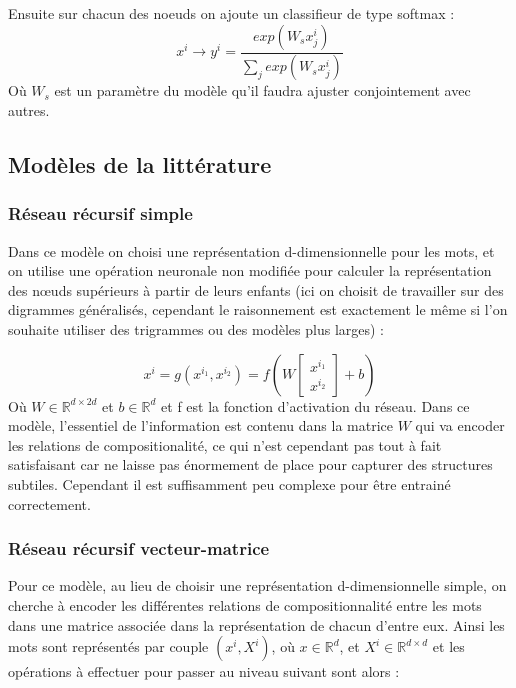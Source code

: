 \documentclass[conference]{IEEEtran}
\begin{document}
Ensuite sur chacun des noeuds on ajoute un classifieur de type softmax :
$$x^i\longrightarrow y^i=\frac{exp{\left(W_s x^i_j\right)}}{\sum_{j}exp{\left(W_s x^i_j\right)}}$$
Où $W_s$ est un paramètre du modèle qu'il faudra ajuster conjointement avec autres.

\subsection{Modèles de la littérature}
\subsubsection{Réseau récursif simple}
Dans ce modèle on choisi une représentation d-dimensionnelle pour les mots, et on utilise une opération neuronale non modifiée pour calculer la représentation des nœuds supérieurs à partir de leurs enfants (ici on choisit de travailler sur des digrammes généralisés, cependant le raisonnement est exactement le même si l'on souhaite utiliser des trigrammes ou des modèles plus larges) :

$$x^i=g(x^{i_1},x^{i_2})=f\left(W\begin{bmatrix} x^{i_1} \\ x^{i_2} \end{bmatrix}+b\right)$$
Où $W\in\mathbb{R}^{d\times 2d}$ et $b\in\mathbb{R}^{d}$ et f est la fonction d'activation du réseau. Dans ce modèle, l'essentiel de l'information est contenu dans la matrice $W$ qui va encoder les relations de compositionalité, ce qui n'est cependant pas tout à fait satisfaisant car ne laisse pas énormement de place pour capturer des structures subtiles. Cependant il est suffisamment peu complexe pour être entrainé correctement.

\subsubsection{Réseau récursif vecteur-matrice}
Pour ce modèle, au lieu de choisir une représentation d-dimensionnelle simple, on cherche à encoder les différentes relations de compositionnalité entre les mots dans une matrice associée dans la représentation de chacun d'entre eux. Ainsi les mots sont représentés par couple $(x^i,X^i)$, où $x\in\mathbb{R}^d$, et $X^{i}\in\mathbb{R}^{d\times d}$ et les opérations à effectuer pour passer au niveau suivant sont alors :
\end{document}
